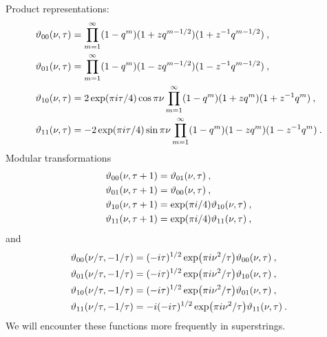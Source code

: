 Product representations: 
\begin{subequations} \label{7.2.38}
	\begin{align}
		\vartheta_{00}(\nu, \tau) &= \prod_{m=1}^{\infty}(1-q^{m})(1+z q^{m-1/2})(1+z^{-1} q^{m-1/2}) \:, \label{7.2.38a} \\ 
		\vartheta_{01}(\nu, \tau) &= \prod_{m=1}^{\infty}(1-q^{m})(1-z q^{m-1/2})(1-z^{-1} q^{m-1/2}) \:, \label{7.2.38b} \\
		\vartheta_{10}(\nu, \tau) &= 2 \exp (\pi i \tau / 4) \cos \pi \nu 
		\prod_{m=1}^{\infty}(1-q^{m})(1+z q^{m})(1+z^{-1} q^{m}) \:, \label{7.2.38c} \\
		\vartheta_{11}(\nu, \tau) &= -2 \exp (\pi i \tau / 4) \sin \pi \nu 
		\prod_{m=1}^{\infty}(1-q^{m})(1-z q^{m})(1-z^{-1} q^{m})  \:. \label{7.2.38d} 
	\end{align}	
\end{subequations}
Modular transformations 
\begin{subequations} \label{7.2.39}
	\begin{align}
		\vartheta_{00}(\nu, \tau+1) &= \vartheta_{01}(\nu, \tau)  \:, \label{7.2.39a} \\
		\vartheta_{01}(\nu, \tau+1) &= \vartheta_{00}(\nu, \tau)  \:, \label{7.2.39b} \\
		\vartheta_{10}(\nu, \tau+1) &= \exp (\pi i / 4) \vartheta_{10}(\nu, \tau) \:, \label{7.2.39c} \\
		\vartheta_{11}(\nu, \tau+1) &= \exp (\pi i / 4) \vartheta_{11}(\nu, \tau) \:, \label{7.2.39d}
	\end{align}
\end{subequations}
and 
\begin{subequations} \label{7.2.40}
	\begin{align}
		\vartheta_{00}(\nu/\tau,-1 / \tau) &= (-i \tau)^{1/2} \exp(\pi i \nu^{2}/\tau) \vartheta_{00}(\nu, \tau) \:, \label{7.2.40a} \\
		\vartheta_{01}(\nu/\tau,-1 / \tau) &= (-i \tau)^{1/2} \exp(\pi i \nu^{2}/\tau) \vartheta_{10}(\nu, \tau) \:, \label{7.2.40b} \\
		\vartheta_{10}(\nu/\tau,-1 / \tau) &= (-i \tau)^{1/2} \exp(\pi i \nu^{2}/\tau) \vartheta_{01}(\nu, \tau) \:, \label{7.2.40c} \\
		\vartheta_{11}(\nu/\tau,-1 / \tau) &=-i(-i \tau)^{1/2} \exp(\pi i \nu^{2}/\tau) \vartheta_{11}(\nu, \tau) \:. \label{7.2.40d} 
	\end{align}
\end{subequations}
We will encounter these functions more frequently in superstrings. 

